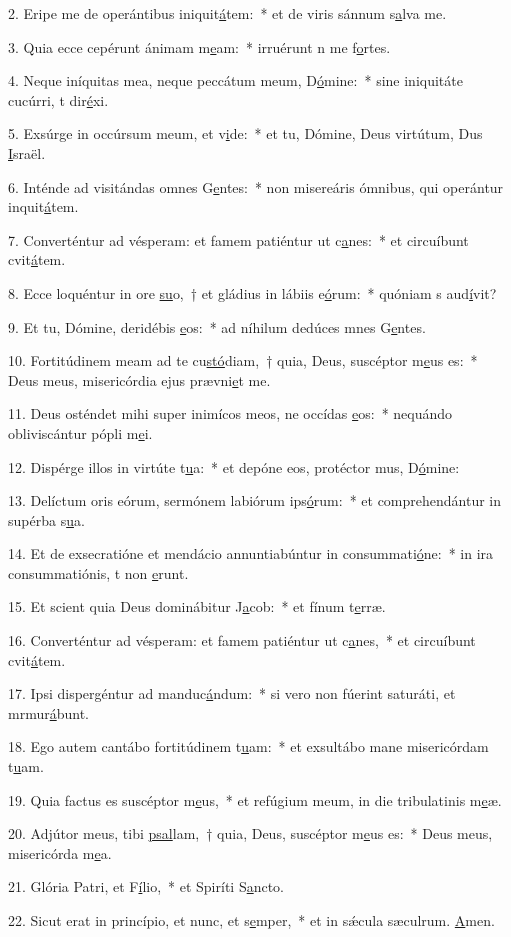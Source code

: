 2. Eripe me de operántibus iniquit\uline{á}tem:~* et de viris sánnum s\uline{a}lva me.\par 
3. Quia ecce cepérunt ánimam m\uline{e}am:~* irruérunt n me f\uline{o}rtes.\par 
4. Neque iníquitas mea, neque peccátum meum, D\uline{ó}mine:~* sine iniquitáte cucúrri, t dir\uline{é}xi.\par 
5. Exsúrge in occúrsum meum, et v\uline{i}de:~* et tu, Dómine, Deus virtútum, Dus \uline{I}sraël.\par 
6. Inténde ad visitándas omnes G\uline{e}ntes:~* non misereáris ómnibus, qui operántur inquit\uline{á}tem.\par 
7. Converténtur ad vésperam: et famem patiéntur ut c\uline{a}nes:~* et circuíbunt cvit\uline{á}tem.\par 
8. Ecce loquéntur in ore \uline{su}o,~† et gládius in lábiis e\uline{ó}rum:~* quóniam s aud\uline{í}vit?\par 
9. Et tu, Dómine, deridébis \uline{e}os:~* ad níhilum dedúces mnes G\uline{e}ntes.\par 
10. Fortitúdinem meam ad te cu\uline{stó}diam,~† quia, Deus, suscéptor m\uline{e}us es:~* Deus meus, misericórdia ejus prævni\uline{e}t me.\par 
11. Deus osténdet mihi super inimícos meos, ne occídas \uline{e}os:~* nequándo obliviscántur pópli m\uline{e}i.\par 
12. Dispérge illos in virtúte t\uline{u}a:~* et depóne eos, protéctor mus, D\uline{ó}mine:\par 
13. Delíctum oris eórum, sermónem labiórum ips\uline{ó}rum:~* et comprehendántur in supérba s\uline{u}a.\par 
14. Et de exsecratióne et mendácio annuntiabúntur in consummati\uline{ó}ne:~* in ira consummatiónis, t non \uline{e}runt.\par 
15. Et scient quia Deus dominábitur J\uline{a}cob:~* et fínum t\uline{e}rræ.\par 
16. Converténtur ad vésperam: et famem patiéntur ut c\uline{a}nes,~* et circuíbunt cvit\uline{á}tem.\par 
17. Ipsi dispergéntur ad manduc\uline{á}ndum:~* si vero non fúerint saturáti, et mrmur\uline{á}bunt.\par 
18. Ego autem cantábo fortitúdinem t\uline{u}am:~* et exsultábo mane misericórdam t\uline{u}am.\par 
19. Quia factus es suscéptor m\uline{e}us,~* et refúgium meum, in die tribulatinis m\uline{e}æ.\par 
20. Adjútor meus, tibi \uline{psal}lam,~† quia, Deus, suscéptor m\uline{e}us es:~* Deus meus, misericórda m\uline{e}a.\par 
21. Glória Patri, et F\uline{í}lio,~* et Spiríti S\uline{a}ncto.\par 
22. Sicut erat in princípio, et nunc, et s\uline{e}mper,~* et in sǽcula sæculrum. \uline{A}men.\par 
